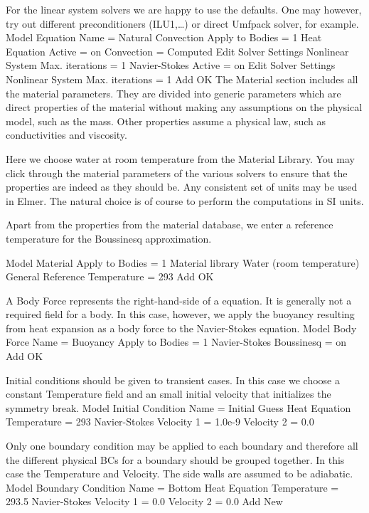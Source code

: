 For the linear system solvers we are happy to use the defaults. One may however, try out different
preconditioners (ILU1,\ldots) or direct Umfpack solver, for example.
\ttbegin
Model
  Equation
    Name = Natural Convection
    Apply to Bodies = 1
    Heat Equation
      Active = on
      Convection = Computed
      Edit Solver Settings
        Nonlinear System
          Max. iterations = 1
    Navier-Stokes 
      Active = on
      Edit Solver Settings
        Nonlinear System
          Max. iterations = 1
    Add 
    OK
\ttend        
The Material section includes all the material parameters.
They are divided into generic parameters which are direct properties of the material
without making any assumptions on the physical model, such as the mass. Other properties assume
a physical law, such as conductivities and viscosity. 

Here we choose water at room temperature from the Material Library.
You may click through the material parameters of the various solvers to ensure that
the properties are indeed as they should be. Any consistent set of units may be used in Elmer.
The natural choice is of course to perform the computations in SI units. 

Apart from the properties from the material database, we enter a
reference temperature for the Boussinesq approximation.    

\ttbegin
Model
  Material
    Apply to Bodies = 1 
    Material library    
      Water (room temperature)
    General 
      Reference Temperature = 293
    Add
    OK
\ttend

A Body Force represents the right-hand-side of a equation. It is generally 
not a required field for a body. In this case, however, we apply the buoyancy resulting from
heat expansion as a body force to the Navier-Stokes equation.
\ttbegin
Model
  Body Force
    Name = Buoyancy
    Apply to Bodies = 1
    Navier-Stokes
      Boussinesq = on
    Add 
    OK
\ttend    

Initial conditions should be given to transient cases. In this case we choose a
constant Temperature field and an small initial velocity that initializes the symmetry break. 
\ttbegin
Model
  Initial Condition
    Name = Initial Guess
    Heat Equation
      Temperature = 293
    Navier-Stokes
      Velocity 1 = 1.0e-9
      Velocity 2 = 0.0
\ttend

Only one boundary condition may be applied to each boundary and therefore all the 
different physical BCs for a boundary should be grouped together. In this case the
Temperature and Velocity. The side walls are assumed to be adiabatic.
\ttbegin
Model
  Boundary Condition
    Name = Bottom
    Heat Equation
      Temperature = 293.5
    Navier-Stokes 
      Velocity 1 = 0.0
      Velocity 2 = 0.0
    Add
    New

